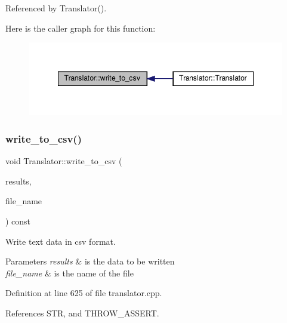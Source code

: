 Referenced by Translator().

Here is the caller graph for this function\+:
\nopagebreak
\begin{figure}[H]
\begin{center}
\leavevmode
\includegraphics[width=348pt]{d4/dee/classTranslator_ae0f2f5edae07acbef328584e64364377_icgraph}
\end{center}
\end{figure}
\mbox{\label{classTranslator_aa1f3f77007cfc652a74f492197871dfb}} 
\subsubsection{\texorpdfstring{write\+\_\+to\+\_\+csv()}{write\_to\_csv()}\hspace{0.1cm}{\footnotesize\ttfamily [2/2]}}
{\footnotesize\ttfamily void Translator\+::write\+\_\+to\+\_\+csv (\begin{DoxyParamCaption}\item[{const std\+::map$<$ std\+::string, \hyperlink{custom__map_8hpp_a18ca01763abbe3e5623223bfe5aaac6b}{Custom\+Map}$<$ std\+::string, std\+::string $>$$>$ \&}]{results,  }\item[{const std\+::string \&}]{file\+\_\+name }\end{DoxyParamCaption}) const}



Write text data in csv format. 


\begin{DoxyParams}{Parameters}
{\em results} & is the data to be written \\
\hline
{\em file\+\_\+name} & is the name of the file \\
\hline
\end{DoxyParams}


Definition at line 625 of file translator.\+cpp.



References S\+TR, and T\+H\+R\+O\+W\+\_\+\+A\+S\+S\+E\+RT.

